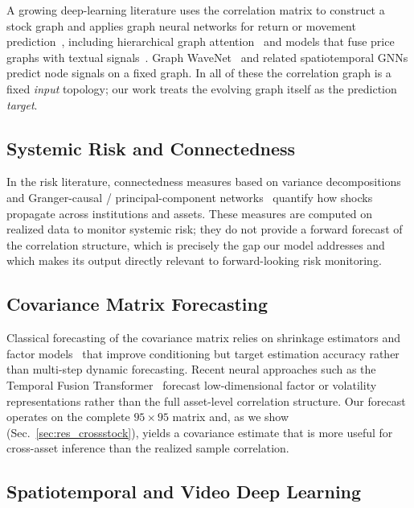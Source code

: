 \documentclass[runningheads]{llncs}
\begin{document}
A growing deep-learning literature uses the correlation matrix to
construct a stock graph and applies graph neural networks for return or
movement prediction~\cite{chen2018incorporating,li2021modeling,feng2019temporal},
including hierarchical graph attention~\cite{kim2019hats} and models that
fuse price graphs with textual signals~\cite{sawhney2020deep}. Graph
WaveNet~\cite{wu2019graph} and related spatiotemporal GNNs predict node
signals on a fixed graph. In all of these the correlation graph is a
fixed \emph{input} topology; our work treats the evolving graph itself as
the prediction \emph{target}.

\subsection{Systemic Risk and Connectedness}

In the risk literature, connectedness measures based on variance
decompositions~\cite{diebold2014network} and Granger-causal /
principal-component networks~\cite{billio2012econometric} quantify how
shocks propagate across institutions and assets. These measures are
computed on realized data to monitor systemic risk; they do not provide a
forward forecast of the correlation structure, which is precisely the gap
our model addresses and which makes its output directly relevant to
forward-looking risk monitoring.

\subsection{Covariance Matrix Forecasting}

Classical forecasting of the covariance matrix relies on shrinkage
estimators and factor models~\cite{ledoit2004honey,ledoit2017nonlinear}
that improve conditioning but target estimation accuracy rather than
multi-step dynamic forecasting. Recent neural approaches such as the
Temporal Fusion Transformer~\cite{lim2021temporal} forecast
low-dimensional factor or volatility representations rather than the full
asset-level correlation structure. Our forecast operates on the complete
$95\times95$ matrix and, as we show (Sec.~\ref{sec:res_crossstock}),
yields a covariance estimate that is more useful for cross-asset
inference than the realized sample correlation.

\subsection{Spatiotemporal and Video Deep Learning}
\end{document}
